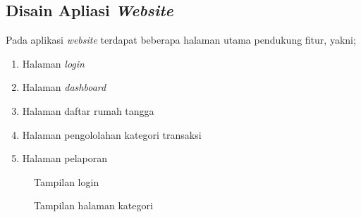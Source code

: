 \subsection{Disain Apliasi \textit{Website}}
\label{subsec:disainaplikasiwebsite}

\hspace{0,5cm}Pada aplikasi \textit{website} terdapat beberapa halaman utama pendukung fitur, yakni;
\begin{enumerate}
	\item Halaman \textit{login}
	\item Halaman \textit{dashboard}
	\item Halaman daftar rumah tangga
	\item Halaman pengololahan kategori transaksi
	\item Halaman pelaporan
\end{enumerate}

\begin{figure}
\centering
{}
\caption[Tampilan login]{Tampilan login} 
\label{fig:design_web_login}
\end{figure}

\begin{figure}
\centering
{}
\caption[Tampilan halaman kategori]{Tampilan halaman kategori} 
\label{fig:design_web_index_kategori}
\end{figure}

